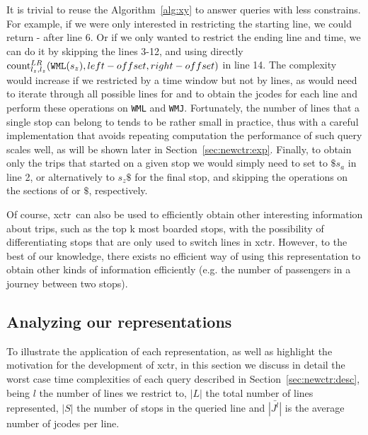     It is trivial to reuse the Algorithm~\ref{alg:xy} to answer queries with less constrains. For example, if we were only interested in restricting the starting line, we could return - after line 6. Or if we only wanted to restrict the ending line and time, we can do it by skipping the lines 3-12, and using directly $\cnt^{LR}_{l_z,l_z}(\FuncSty{WML}(s_z),left-offset,right-offset)$ in line 14. The complexity would increase if we restricted by a time window but not by lines, as would need to iterate through all possible lines for  and  to obtain the jcodes for each line and perform these operations on \texttt{WML} and \texttt{WMJ}. Fortunately, the number of lines that a single stop can belong to tends to be rather small in practice, thus with a careful implementation that avoids repeating computation the performance of such query scales well, as will be shown later in Section~\ref{sec:newctr:exp}. Finally, to obtain only the trips that started on a given stop we would simply need to set  to $\$s_a$ in line 2, or alternatively to $s_z\$$ for the final stop, and skipping the operations on the sections of  or $\$$, respectively.
    
    Of course, \gls{xctr}~can also be used to efficiently obtain other interesting information about trips, such as the top k most boarded stops, 
    with the possibility of differentiating stops that are only used to switch lines in \gls{xctr}. However, to the best of our knowledge, there exists no efficient way of using this representation to obtain other kinds of information efficiently (e.g. the number of passengers in a journey between two stops).
	
	\subsection{Analyzing our representations}
	\label{sec:newctr:algo:analysis}
	To illustrate the application of each representation, as well as highlight the motivation for the development of \gls{xctr}, in this section we discuss in detail the worst case time complexities of each query described in Section~\ref{sec:newctr:desc}, being $l$ the number of lines we restrict to, $|L|$ the total number of lines represented, $|S|$ the number of stops in the queried line and $\bar{|J^l|}$ is the average number of jcodes per line.
    
